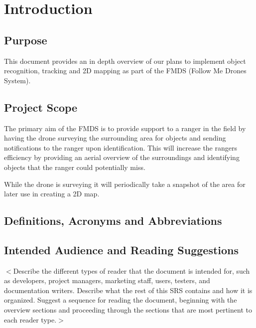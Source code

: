 \chapter{Introduction}

\section{Purpose}
This document provides an in depth overview of our plans to implement object recognition, tracking and 2D mapping as part of the FMDS (Follow Me Drones System).    

\section{Project Scope}

The primary aim of the FMDS is to provide support to a ranger in the field by having the drone surveying the surrounding area for objects and sending notifications to the ranger upon identification. This will increase the rangers efficiency by providing an aerial overview of the surroundings and identifying objects that the ranger could potentially miss.

While the drone is surveying it will periodically take a snapshot of the area for later use in creating a 2D map. 

\section{Definitions, Acronyms and Abbreviations}


\section{Intended Audience and Reading Suggestions}
$<$Describe the different types of reader that the document is intended for,
such as developers, project managers, marketing staff, users, testers, and
documentation writers. Describe what the rest of this SRS contains and how it is
organized. Suggest a sequence for reading the document, beginning with the
overview sections and proceeding through the sections that are most pertinent to
each reader type.$>$



